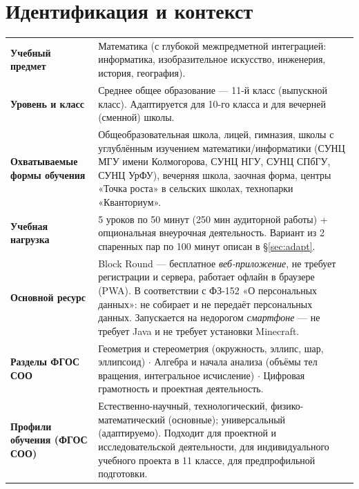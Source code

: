 \documentclass[12pt,a4paper]{scrartcl}
\begin{document}
\renewcommand{\contentsname}{\color{accent}Содержание}
\tableofcontents
\thispagestyle{fancy}
\newpage

\section{Идентификация и контекст}\label{sec:identificacao}

\begin{center}
\begin{tabular}{@{}p{}p{}@{}}
\toprule
\textbf{Учебный предмет} & Математика (с глубокой межпредметной интеграцией: информатика, изобразительное искусство, инженерия, история, география). \\
\addlinespace[2pt]
\textbf{Уровень и класс} & Среднее общее образование --- 11-й класс (выпускной класс). Адаптируется для 10-го класса и для вечерней (сменной) школы. \\
\addlinespace[2pt]
\textbf{Охватываемые формы обучения} & Общеобразовательная школа, лицей, гимназия, школы с углублённым изучением математики/информатики (СУНЦ МГУ имени Колмогорова, СУНЦ НГУ, СУНЦ СПбГУ, СУНЦ УрФУ), вечерняя школа, заочная форма, центры «Точка роста» в сельских школах, технопарки «Кванториум». \\
\addlinespace[2pt]
\textbf{Учебная нагрузка} & 5 уроков по 50 минут (250 мин аудиторной работы) + опциональная внеурочная деятельность. Вариант из 2 спаренных пар по 100 минут описан в §\ref{sec:adapt}. \\
\addlinespace[2pt]
\textbf{Основной ресурс} & Block Round --- бесплатное \emph{веб-приложение}, не требует регистрации и сервера, работает офлайн в браузере (PWA). В соответствии с ФЗ-152 «О персональных данных»: не собирает и не передаёт персональных данных. Запускается на недорогом \emph{смартфоне} --- не требует Java и не требует установки Minecraft. \\
\addlinespace[2pt]
\textbf{Разделы ФГОС СОО} & Геометрия и стереометрия (окружность, эллипс, шар, эллипсоид) $\cdot$ Алгебра и начала анализа (объёмы тел вращения, интегральное исчисление) $\cdot$ Цифровая грамотность и проектная деятельность. \\
\addlinespace[2pt]
\textbf{Профили обучения (ФГОС СОО)} & Естественно-научный, технологический, физико-математический (основные); универсальный (адаптируемо). Подходит для проектной и исследовательской деятельности, для индивидуального учебного проекта в 11 классе, для предпрофильной подготовки. \\

\end{tabular}
\end{center}
\end{document}
